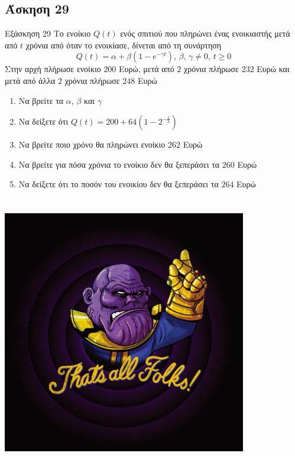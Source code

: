 \documentclass[greek]{beamer}
\begin{document}
\subsection{Άσκηση 29}
\begin{frame}[label=Άσκηση29,t]{Εξάσκηση 29}
 Το ενοίκιο $Q(t)$ ενός σπιτιού που πληρώνει ένας ενοικιαστής μετά από $t$ χρόνια από όταν το ενοικίασε, δίνεται από τη συνάρτηση
 $$Q(t)=α+β(1-e^{-γt}) \text{, } β \text{, } γ\ne 0\text{, } t\ge 0$$
 Στην αρχή πλήρωσε ενοίκιο $200$ Ευρώ, μετά από $2$ χρόνια πλήρωσε $232$ Ευρώ και μετά από άλλα $2$ χρόνια πλήρωσε $248$ Ευρώ
 \begin{enumerate}
  \item<1-> Να βρείτε τα $α$, $β$ και $γ$
  \item<2-> Να δείξετε ότι $Q(t)=200+64\left( 1-2^{-\frac{1}{2}} \right) $
  \item<3-> Να βρείτε ποιο χρόνο θα πληρώνει ενοίκιο $262$ Ευρώ
  \item<4-> Να βρείτε για πόσα χρόνια το ενοίκιο δεν θα ξεπεράσει τα $260$ Ευρώ
  \item<5-> Να δείξετε ότι το ποσόν του ενοικίου δεν θα ξεπεράσει τα $264$ Ευρώ
 \end{enumerate}

\end{frame}

\appendix

\section{}
\begin{frame}
\centering
 \includegraphics[width=0.8\textwidth]{"./images/thatsall.png"}

\end{frame}
\end{document}
